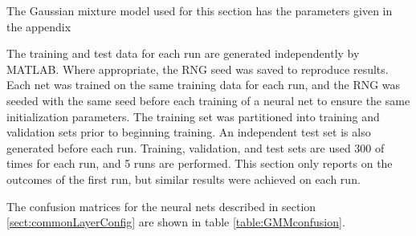 \label{sect:GMMresults}
The Gaussian mixture model used for this section has the parameters given in the appendix 


The training and test data for each run are generated independently by MATLAB. Where appropriate, the RNG seed was saved to reproduce results.  Each net was trained on the same training data for each run, and the RNG was seeded with the same seed before each training of a neural net to ensure the same initialization parameters. The training set was partitioned into training and validation sets prior to beginning training.  An independent test set is also generated before each run.  Training, validation, and test sets are used 300 of times for each run, and 5 runs are performed.  This section only reports on the outcomes of the first run, but similar results were achieved on each run.

The confusion matrices for the neural nets described in section \ref{sect:commonLayerConfig} are shown in table \ref{table:GMMconfusion}.

